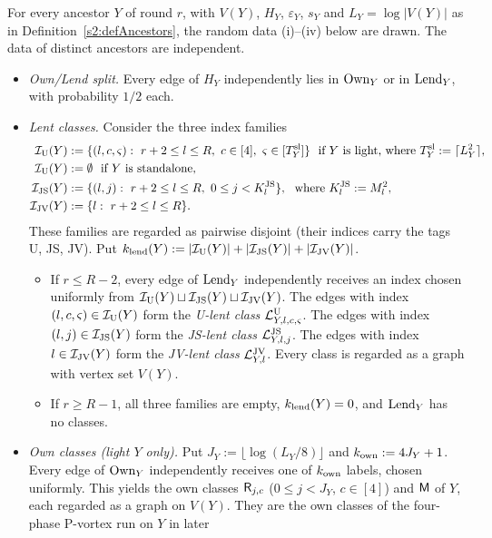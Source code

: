 \begin{definition}\label{s3:defCOL}
For every ancestor $Y$ of round $r$, with $V(Y)$, $H_Y$,
$\varepsilon_Y$, $s_Y$ and $L_Y=\log|V(Y)|$ as in
Definition~\ref{s2:defAncestors}, the random data (i)--(iv) below are
drawn. The data of distinct ancestors are independent.
\begin{itemize}
\item[(i)] \emph{Own/Lend split.} Every edge of $H_Y$ independently lies
  in $\mathrm{Own}_Y$ or in $\mathrm{Lend}_Y$, with probability $1/2$ each.
\item[(ii)] \emph{Lent classes.} Consider the three index families
  \[
  \begin{aligned}
  \IU(Y)&:=\{(l,c,\uslot):\ r+2\le l\le R,\ c\in[4],\ \uslot\in[\Tslot_Y]\}\ \text{ if $Y$ is light, where } \Tslot_Y:=\lceil L_Y^2\rceil,\\
  \IU(Y)&:=\emptyset\ \text{ if $Y$ is standalone,}\\
  \IJS(Y)&:=\{(l,j):\ r+2\le l\le R,\ 0\le j<\KJS_l\},\ \text{ where } \KJS_l:=M_l^2,\\
  \IJV(Y)&:=\{l:\ r+2\le l\le R\}.
  \end{aligned}
  \]
  These families are regarded as pairwise disjoint (their indices carry
  the tags U, JS, JV). Put
  $k_{\mathrm{lend}}(Y):=|\mathcal{I}_{\mathrm{U}}(Y)|+|\mathcal{I}_{\mathrm{JS}}(Y)|+|\mathcal{I}_{\mathrm{JV}}(Y)|$.
  \begin{itemize}
  \item If $r\le R-2$, every edge of $\mathrm{Lend}_Y$ independently receives an
    index chosen uniformly from $\mathcal{I}_{\mathrm{U}}(Y)\sqcup\mathcal{I}_{\mathrm{JS}}(Y)\sqcup\mathcal{I}_{\mathrm{JV}}(Y)$. The
    edges with index $(l,c,\varsigma)\in\mathcal{I}_{\mathrm{U}}(Y)$ form the \emph{U-lent class}
    $\mathcal{L}^{\mathrm{U}}_{Y,l,c,\varsigma}$. The edges with index $(l,j)\in\mathcal{I}_{\mathrm{JS}}(Y)$ form the
    \emph{JS-lent class} $\mathcal{L}^{\mathrm{JS}}_{Y,l,j}$. The edges with index
    $l\in\mathcal{I}_{\mathrm{JV}}(Y)$ form the \emph{JV-lent class} $\mathcal{L}^{\mathrm{JV}}_{Y,l}$. Every
    class is regarded as a graph with vertex set $V(Y)$.
  \item If $r\ge R-1$, all three families are empty, $k_{\mathrm{lend}}(Y)=0$, and
    $\mathrm{Lend}_Y$ has no classes.
  \end{itemize}
\item[(iii)] \emph{Own classes (light $Y$ only).} Put
  $J_Y:=\lfloor\log(L_Y/8)\rfloor$ and $k_{\mathrm{own}}:=4J_Y+1$. Every edge of
  $\mathrm{Own}_Y$ independently receives one of $k_{\mathrm{own}}$ labels, chosen
  uniformly. This yields the own classes $\mathsf{R}_{j,c}$ ($0\le j<J_Y$,
  $c\in[4]$) and $\mathsf{M}$ of $Y$, each regarded as a graph on $V(Y)$. They
  are the own classes of the four-phase P-vortex run on $Y$ in later

\end{itemize}
\end{definition}
